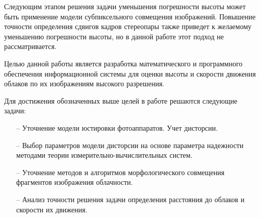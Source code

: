 Следующим этапом решения задачи уменьшения погрешности высоты может быть применение модели субпиксельного совмещения изображений.
Повышение точности определения сдвигов кадров стереопары также приведет к желаемому уменьшению погрешности высоты, но в данной работе
этот подход не рассматривается.

Целью данной работы является разработка математического и программного обеспечения информационной системы для оценки высоты и скорости
движения облаков по их изображениям высокого разрешения.

Для достижения обозначенных выше целей в работе решаются следующие задачи:
\begin{itemize}
  \item[--] Уточнение модели юстировки фотоаппаратов. Учет дисторсии.
  \item[--] Выбор параметров модели дисторсии на основе параметра надежности методами теории измерительно-вычислительных систем.
  \item[--] Уточнение методов и алгоритмов морфологического совмещения фрагментов изображения облачности.
  \item[--] Анализ точности решения задачи определения расстояния до облаков и скорости их движения.
\end{itemize}





